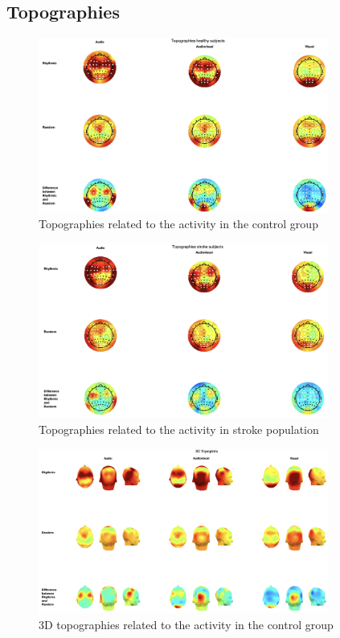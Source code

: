 \subsection*{Topographies}
\begin{figure}[htbp]
    \centering
    \includegraphics[width=0.85\textwidth]{healthy_images/topo.png}
    \caption{Topographies related to the activity in the control group}
    \label{fig: topographies control group}
\end{figure}
\begin{figure}[htbp]
    \centering
    \includegraphics[width=0.85\textwidth]{stroke_images/topographies.png}
    \caption{Topographies related to the activity in stroke population}
    \label{fig: topographies stroke group}
\end{figure}
\begin{figure}[htbp]
    \centering
    \includegraphics[width=0.85\textwidth]{healthy_images/3d_topo.png}
    \caption{3D topographies related to the activity in the control group}
    \label{fig: 3D topographies control group}   
\end{figure} 
